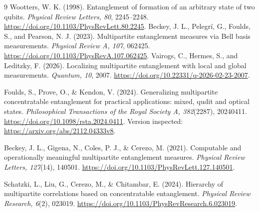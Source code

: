 \documentclass[11pt,a4paper]{article}
\begin{document}
\begin{thebibliography}{9}
 Wootters, W. K. (1998). Entanglement of formation of an arbitrary state of two qubits. \emph{Physical Review Letters, 80}, 2245--2248. \url{https://doi.org/10.1103/PhysRevLett.80.2245}.
 Beckey, J. L., Pelegrí, G., Foulds, S., and Pearson, N. J. (2023). Multipartite entanglement measures via Bell basis measurements. \emph{Physical Review A, 107}, 062425. \url{https://doi.org/10.1103/PhysRevA.107.062425}.
 Vairogs, C., Hermes, S., and Leditzky, F. (2026). Localizing multipartite entanglement with local and global measurements. \emph{Quantum, 10}, 2007. \url{https://doi.org/10.22331/q-2026-02-23-2007}.

Foulds, S., Prove, O., \& Kendon, V. (2024).
Generalizing multipartite concentratable entanglement for practical applications: mixed, qudit and optical states.
\emph{Philosophical Transactions of the Royal Society A, 382}(2287), 20240411.
\url{https://doi.org/10.1098/rsta.2024.0411}.
Version inspected: \url{https://arxiv.org/abs/2112.04333v8}.

Beckey, J. L., Gigena, N., Coles, P. J., \& Cerezo, M. (2021).
Computable and operationally meaningful multipartite entanglement measures.
\emph{Physical Review Letters, 127}(14), 140501.
\url{https://doi.org/10.1103/PhysRevLett.127.140501}.

Schatzki, L., Liu, G., Cerezo, M., \& Chitambar, E. (2024).
Hierarchy of multipartite correlations based on concentratable entanglement.
\emph{Physical Review Research, 6}(2), 023019.
\url{https://doi.org/10.1103/PhysRevResearch.6.023019}.
\end{thebibliography}
\end{document}
